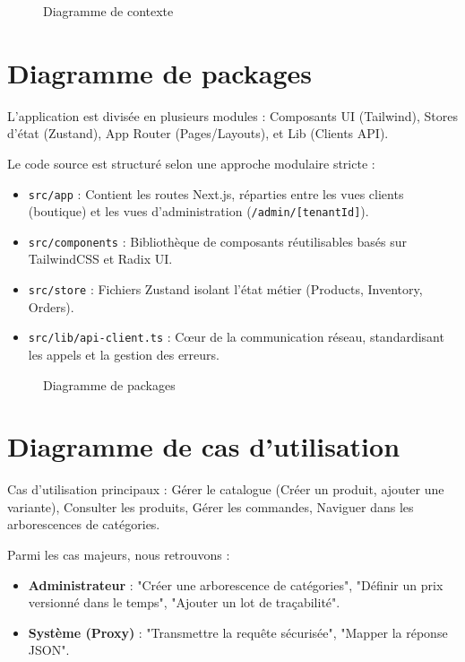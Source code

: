 \documentclass[12pt, a4paper]{report}
\begin{document}
\begin{figure}[h!]
    \centering
    \vspace{6cm} %
    \caption{Diagramme de contexte}
    \label{fig:contexte}
\end{figure}

\section{Diagramme de packages}
L'application est divisée en plusieurs modules : Composants UI (Tailwind), Stores d'état (Zustand), App Router (Pages/Layouts), et Lib (Clients API).

Le code source est structuré selon une approche modulaire stricte :
\begin{itemize}
    \item \texttt{src/app} : Contient les routes Next.js, réparties entre les vues clients (boutique) et les vues d'administration (\texttt{/admin/[tenantId]}).
    \item \texttt{src/components} : Bibliothèque de composants réutilisables basés sur TailwindCSS et Radix UI.
    \item \texttt{src/store} : Fichiers Zustand isolant l'état métier (Products, Inventory, Orders).
    \item \texttt{src/lib/api-client.ts} : Cœur de la communication réseau, standardisant les appels et la gestion des erreurs.
\end{itemize}

\begin{figure}[h!]
    \centering
    \vspace{6cm} %
    \caption{Diagramme de packages}
    \label{fig:packages}
\end{figure}

\section{Diagramme de cas d'utilisation}
Cas d'utilisation principaux : Gérer le catalogue (Créer un produit, ajouter une variante), Consulter les produits, Gérer les commandes, Naviguer dans les arborescences de catégories.

Parmi les cas majeurs, nous retrouvons :
\begin{itemize}
    \item \textbf{Administrateur} : "Créer une arborescence de catégories", "Définir un prix versionné dans le temps", "Ajouter un lot de traçabilité".
    \item \textbf{Système (Proxy)} : "Transmettre la requête sécurisée", "Mapper la réponse JSON".
\end{itemize}
\end{document}
